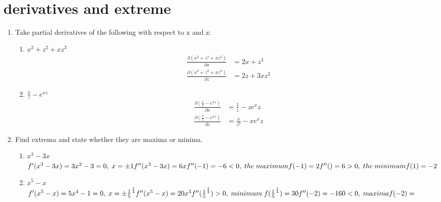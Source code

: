 \documentclass [12pt] {article}
\begin{document}
\section{derivatives and extreme}
\begin{enumerate}
    \item Take partial derivatives of the following with respect to x and z:
    \begin{enumerate}
        \item $x^2+z^2 + xz^3$ \\
            \begin{equation*}
            \begin{aligned}
            \frac{\partial (x^2+z^2 + xz^3)}{\partial x} &= 2x +z^3 \\
            \frac{\partial (x^2+z^2 + xz^3)}{\partial z} &= 2z + 3xz^2
            \end{aligned}
            \end{equation*}
    \item $ \displaystyle \frac{x}{z} - e^{xz}$
        \begin{equation*}
    \begin{aligned}
          \frac{\partial (\frac{x}{z} - e^{xz})}{\partial x}& = \frac{1}{z} -ze^xz\\
           \frac{\partial (\frac{x}{z} - e^{xz})}{\partial z} &= \frac{x}{z^2} -xe^xz
    \end{aligned}
        \end{equation*}
        \end{enumerate}
    \item Find extrema and state whether they are maxima or minima.
        \begin{enumerate}
            \item $x^3- 3x$ \\ 
            $ f'(x^3- 3x) = 3x^2 - 3 = 0, \; x = \pm 1 \\ 
            f''(x^3- 3x) = 6x \\
            f''(-1) = -6 <0, \; the \; maximum f(-1) = 2\\
            f''() = 6 >0, \; the \; minimum f(1) = -2$
            \item $x^5 - x$ \\ 
            $ f'(x^5 - x) = 5x^4 -1 = 0, \; x = \pm {\frac{1}{5}}^{\frac{1}{4}}\\ 
            f''(x^5 - x) = 20x^3 \\ 
            f''({\frac{1}{5}}^{\frac{1}{4}}) >0, \; minimum \; f({\frac{1}{5}}^{\frac{1}{4}}) = 30 \\
            f''(-2) = -160 <0, \; maxima f(-2) = $
                
        \end{enumerate}
\end{enumerate}
\newpage
\end{document}
